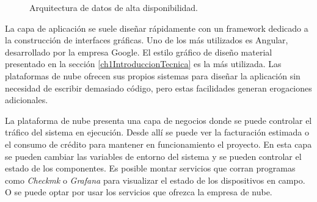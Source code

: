 \begin{figure}[h]
	\centering
	\caption{Arquitectura de datos de alta disponibilidad.}
	\label{fig:ch1DatosAltaDisponibilidad}
\end{figure}

La capa de aplicación se suele diseñar rápidamente con un framework dedicado a la construcción de interfaces gráficas.
Uno de los más utilizados es Angular, desarrollado por la empresa Google.
El estilo gráfico de diseño material presentado en la sección \ref{ch1IntroduccionTecnica} es la más utilizada.
Las plataformas de nube ofrecen sus propios sistemas para diseñar la aplicación sin necesidad de escribir demasiado código, pero estas facilidades generan erogaciones adicionales.

La plataforma de nube presenta una capa de negocios donde se puede controlar el tráfico del sistema en ejecución.
Desde allí se puede ver la facturación estimada o el consumo de crédito para mantener en funcionamiento el proyecto.
En esta capa se pueden cambiar las variables de entorno del sistema y se pueden controlar el estado de los componentes.
Es posible montar servicios que corran programas como \emph{Checkmk} o \emph{Grafana} para visualizar el estado de los dispositivos en campo. O se puede optar por usar los servicios que ofrezca la empresa de nube.

